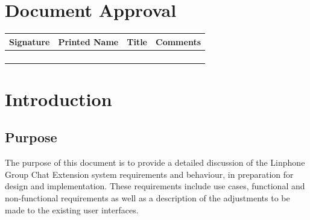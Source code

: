 \documentclass[11pt]{article}
\begin{document}
\section{Document Approval}
\begin{table}[h]
\begin{tabular}{llll}
\textbf{Signature}     & \textbf{Printed Name} & \textbf{Title}        & \textbf{Comments}     \\ \hline
\multicolumn{1}{|l|}{} & \multicolumn{1}{L{3.5cm}|}{} & \multicolumn{1}{L{3.5cm}|}{} & \multicolumn{1}{L{4cm}|}{} \\ \hline
\multicolumn{1}{|l|}{} & \multicolumn{1}{l|}{} & \multicolumn{1}{l|}{} & \multicolumn{1}{l|}{} \\ \hline
\multicolumn{1}{|l|}{} & \multicolumn{1}{l|}{} & \multicolumn{1}{l|}{} & \multicolumn{1}{l|}{} \\ \hline
\multicolumn{1}{|l|}{} & \multicolumn{1}{l|}{} & \multicolumn{1}{l|}{} & \multicolumn{1}{l|}{} \\ \hline
\end{tabular}
\end{table}

\newpage
\section{Introduction}

\subsection{Purpose}
The purpose of this document is to provide a detailed discussion of the Linphone Group Chat Extension system requirements and behaviour, in preparation for design and implementation. These requirements include use cases, functional and non-functional requirements as well as a description of the adjustments to be made to the existing user interfaces.
\end{document}
